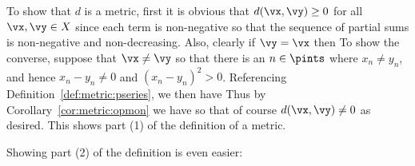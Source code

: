 {{    To show that $d$ is a metric, first it is obvious that $d(\vx, \vy) \geq 0$ for all $\vx, \vy \in X$ since each term is non-negative so that the sequence of partial sums is non-negative and non-decreasing.
    Also, clearly if $\vy = \vx$ then
    To show the converse, suppose that $\vx \neq \vy$ so that there is an $n \in \pints$ where $x_n \neq y_n$, and hence $x_n - y_n \neq 0$ and $(x_n - y_n)^2 > 0$.
    Referencing Definition~\ref{def:metric:pseries}, we then have
    Thus by Corollary~\ref{cor:metric:opmon} we have
    so that of course $d(\vx, \vy) \neq 0$ as desired.
    This shows part (1) of the definition of a metric.

    Showing part (2) of the definition is even easier:

}}
